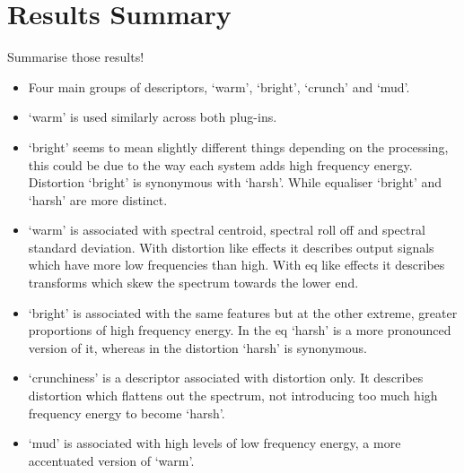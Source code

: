 \section{Results Summary}
	\note
	{
		Summarise those results!

		\begin{itemize}
			\item Four main groups of descriptors, `warm', `bright', `crunch' and `mud'.
			\item `warm' is used similarly across both plug-ins.
			\item `bright' seems to mean slightly different things depending on the processing, this could be
				due to the way each system adds high frequency energy. Distortion `bright' is synonymous
				with `harsh'. While equaliser `bright' and `harsh' are more distinct.
			\item `warm' is associated with spectral centroid, spectral roll off and spectral standard
				deviation. With distortion like effects it describes output signals which have more low
				frequencies than high. With eq like effects it describes transforms which skew the spectrum
				towards the lower end.
			\item `bright' is associated with the same features but at the other extreme, greater proportions
				of high frequency energy. In the eq `harsh' is a more pronounced version of it, whereas in
				the distortion `harsh' is synonymous.
			\item `crunchiness' is a descriptor associated with distortion only. It describes distortion which
				flattens out the spectrum, not introducing too much high frequency energy to become
				`harsh'.
			\item `mud' is associated with high levels of low frequency energy, a more accentuated version of
				`warm'.
		\end{itemize}
	}
